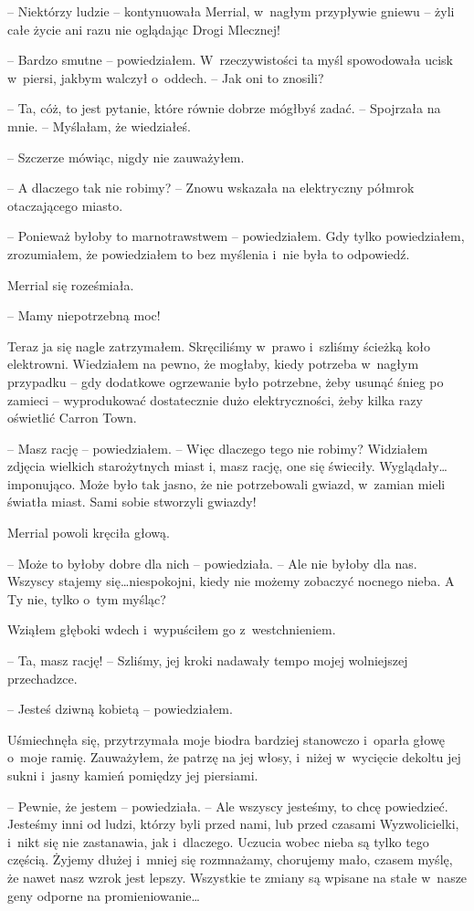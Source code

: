 \documentclass[oneside,polish,11pt,sfheadings]{mwbk}
\begin{document}
-- Niektórzy ludzie -- kontynuowała Merrial, w~nagłym przypływie gniewu -- żyli całe życie ani razu nie oglądając Drogi Mlecznej!

-- Bardzo smutne -- powiedziałem. W~rzeczywistości ta myśl spowodowała
ucisk w~piersi, jakbym walczył o~oddech. -- Jak oni to znosili?

-- Ta, cóż, to jest pytanie, które równie dobrze mógłbyś zadać. -- Spojrzała na mnie. -- Myślałam, że wiedziałeś.

-- Szczerze mówiąc, nigdy nie zauważyłem.

-- A dlaczego tak nie robimy? -- Znowu wskazała na elektryczny półmrok
otaczającego miasto.

-- Ponieważ byłoby to marnotrawstwem -- powiedziałem. Gdy tylko
powiedziałem, zrozumiałem, że powiedziałem to bez myślenia i~nie była to
odpowiedź.

Merrial się roześmiała. 

-- Mamy niepotrzebną moc!

Teraz ja się nagle zatrzymałem. Skręciliśmy w~prawo i~szliśmy ścieżką
koło elektrowni. Wiedziałem na pewno, że mogłaby, kiedy potrzeba w~nagłym przypadku -- gdy dodatkowe ogrzewanie było potrzebne, żeby
usunąć śnieg po zamieci -- wyprodukować dostatecznie dużo elektryczności,
żeby kilka razy oświetlić Carron Town.

-- Masz rację -- powiedziałem. -- Więc dlaczego tego nie robimy? Widziałem
zdjęcia wielkich starożytnych miast i, masz rację, one się świeciły.
Wyglądały\ldots imponująco. Może było tak jasno, że nie potrzebowali
gwiazd, w~zamian mieli światła miast. Sami sobie stworzyli gwiazdy!

Merrial powoli kręciła głową.

-- Może to byłoby dobre dla nich -- powiedziała. -- Ale nie byłoby dla nas.
Wszyscy stajemy się\ldots niespokojni, kiedy nie możemy zobaczyć nocnego
nieba. A Ty nie, tylko o~tym myśląc?

Wziąłem głęboki wdech i~wypuściłem go z~westchnieniem. 

-- Ta, masz rację! -- Szliśmy, jej kroki nadawały tempo mojej wolniejszej
przechadzce.

-- Jesteś dziwną kobietą -- powiedziałem.

Uśmiechnęła się, przytrzymała moje biodra bardziej stanowczo i~oparła
głowę o~moje ramię. Zauważyłem, że patrzę na jej włosy, i~niżej w~wycięcie dekoltu jej sukni i~jasny kamień pomiędzy jej piersiami.

-- Pewnie, że jestem -- powiedziała. -- Ale wszyscy jesteśmy, to chcę
powiedzieć. Jesteśmy inni od ludzi, którzy byli przed nami, lub przed
czasami Wyzwolicielki, i~nikt się nie zastanawia, jak i~dlaczego.
Uczucia wobec nieba są tylko tego częścią. Żyjemy dłużej i~mniej się
rozmnażamy, chorujemy mało, czasem myślę, że nawet nasz wzrok jest
lepszy. Wszystkie te zmiany są wpisane na stałe w~nasze geny odporne na
promieniowanie\ldots
\end{document}

